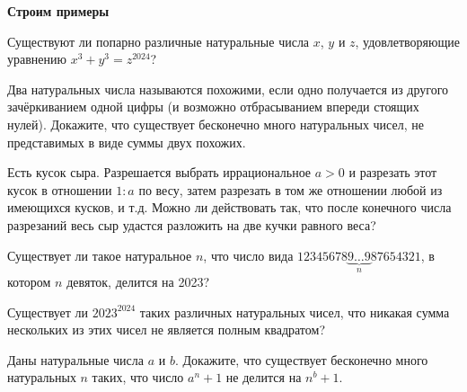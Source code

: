 \documentclass{article}
\begin{document}
    \large

    \begin{center}
        \textbf{Строим примеры}
    \end{center}

    \begin{enumerate_boxed}

        \item  Существуют ли попарно различные натуральные числа $x$, $y$ и $z$, удовлетворяющие
        уравнению $x^3 + y^3 =z^{2024}$?

        \item Два натуральных числа называются похожими, если одно получается из другого зачёркиванием одной цифры (и возможно отбрасыванием впереди стоящих нулей).
        Докажите, что существует бесконечно много натуральных чисел, не представимых в виде суммы двух похожих.

        \item Есть кусок сыра.
        Разрешается выбрать иррациональное $a > 0$ и разрезать этот кусок в отношении $1 : a$ по весу, затем разрезать в том же отношении любой из имеющихся кусков, и т.д. Можно ли действовать так, что после конечного числа разрезаний весь сыр удастся разложить на две кучки равного веса?

        \item Существует ли такое натуральное $n$, что число вида $12345678\underbrace{9\dotsc9}_{n}87654321$, в котором $n$ девяток, делится на 2023?

        \item Существует ли $2023^{2024}$ таких различных натуральных чисел, что никакая сумма нескольких из этих чисел не является полным квадратом?

        \item Даны натуральные числа $a$ и $b$.
        Докажите, что существует бесконечно много натуральных $n$ таких, что число $a^n + 1$ не делится на $n^b + 1$.

    \end{enumerate_boxed}
\end{document}
